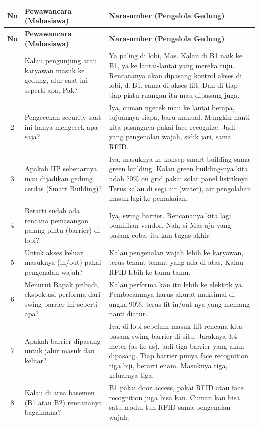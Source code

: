 \begin{longtable}{|c|p{}|p{}|}
\hline
\textbf{No} & \textbf{Pewawancara (Mahasiswa)} & \textbf{Narasumber (Pengelola Gedung)} \\ \hline
\endfirsthead
\hline
\textbf{No} & \textbf{Pewawancara (Mahasiswa)} & \textbf{Narasumber (Pengelola Gedung)} \\ \hline
\endhead
\hline
\endfoot
\hline
\endlastfoot
1 & Kalau pengunjung atau karyawan masuk ke gedung, alur saat ini seperti apa, Pak? & Ya paling di lobi, Mas. Kalau di B1 naik ke B1, ya ke lantai-lantai yang mereka tuju. Rencananya akan dipasang kontrol akses di lobi, di B1, sama di akses lift. Dan di tiap-tiap pintu ruangan itu mau dipasang juga. \\ \hline
2 & Pengecekan security saat ini hanya mengecek apa saja? & Iya, cuman ngecek mau ke lantai berapa, tujuannya siapa, baru manual. Mungkin nanti kita pasangnya pakai face recognize. Jadi yang pengenalan wajah, sidik jari, sama RFID. \\ \hline
3 & Apakah IIP sebenarnya mau dijadikan gedung cerdas (Smart Building)? & Iya, masuknya ke konsep smart building sama green building. Kalau green building-nya kita udah 30\% on grid pakai solar panel listriknya. Terus kalau di segi air (water), air pengolahan masuk lagi ke pemakaian. \\ \hline
4 & Berarti sudah ada rencana pemasangan palang pintu (barrier) di lobi? & Iya, swing barrier. Rencananya kita lagi pemilihan vendor. Nah, si Mas aja yang pasang coba, itu kan tugas akhir. \\ \hline
5 & Untuk akses keluar masuknya (in/out) pakai pengenalan wajah? & Kalau pengenalan wajah lebih ke karyawan, terus tenant-tenant yang ada di atas. Kalau RFID lebih ke tamu-tamu. \\ \hline
6 & Menurut Bapak pribadi, ekspektasi performa dari swing barrier ini seperti apa? & Kalau performa kan itu lebih ke elektrik ya. Pembacaannya harus akurat maksimal di angka 90\%, terus fit in/out-nya yang memang nanti diatur. \\ \hline
7 & Apakah barrier dipasang untuk jalur masuk dan keluar? & Iya, di lobi sebelum masuk lift rencana kita pasang swing barrier di situ. Jaraknya 3,4 meter (as ke as), jadi tiga barrier yang akan dipasang. Tiap barrier punya face recognition tiga biji, berarti enam. Masuknya tiga, keluarnya tiga. \\ \hline
8 & Kalau di area basemen (B1 atau B2) rencananya bagaimana? & B1 pakai door access, pakai RFID atau face recognition juga bisa kan. Cuman kan bisa satu modul tuh RFID sama pengenalan wajah. \\ \hline

\end{longtable}
